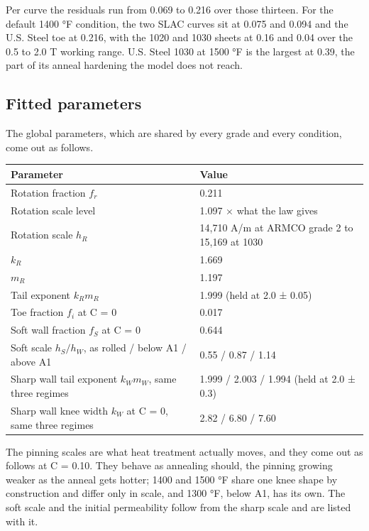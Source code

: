 \documentclass[
  11pt,
]{article}
\newcounter{none} %
\begin{document}
Per curve the residuals run from 0.069 to 0.216 over those thirteen. For the default 1400 °F condition, the two SLAC curves sit at 0.075 and 0.094 and the U.S. Steel toe at 0.216, with the 1020 and 1030 sheets at 0.16 and 0.04 over the 0.5 to 2.0 T working range. U.S. Steel 1030 at 1500 °F is the largest at 0.39, the part of its anneal hardening the model does not reach.

\subsection{Fitted parameters}\label{fitted-parameters}

The global parameters, which are shared by every grade and every condition, come out as follows.

{\def\LTcaptype{none} %
\begin{longtable}[]{@{}ll@{}}
\toprule\noalign{}
Parameter & Value \\
\midrule\noalign{}
\endhead
\bottomrule\noalign{}
\endlastfoot
Rotation fraction \(f_r\) & 0.211 \\
Rotation scale level & 1.097 \(\times\) what the law gives \\
Rotation scale \(h_R\) & 14,710 A/m at ARMCO grade 2 to 15,169 at 1030 \\
\(k_R\) & 1.669 \\
\(m_R\) & 1.197 \\
Tail exponent \(k_R m_R\) & 1.999 (held at 2.0 ± 0.05) \\
Toe fraction \(f_i\) at C = 0 & 0.017 \\
Soft wall fraction \(f_S\) at C = 0 & 0.644 \\
Soft scale \(h_S/h_W\), as rolled / below A1 / above A1 & 0.55 / 0.87 / 1.14 \\
Sharp wall tail exponent \(k_W m_W\), same three regimes & 1.999 / 2.003 / 1.994 (held at 2.0 ± 0.3) \\
Sharp wall knee width \(k_W\) at C = 0, same three regimes & 2.82 / 6.80 / 7.60 \\
\end{longtable}
}

The pinning scales are what heat treatment actually moves, and they come out as follows at C = 0.10. They behave as annealing should, the pinning growing weaker as the anneal gets hotter; 1400 and 1500 °F share one knee shape by construction and differ only in scale, and 1300 °F, below A1, has its own. The soft scale and the initial permeability follow from the sharp scale and are listed with it.
\end{document}
